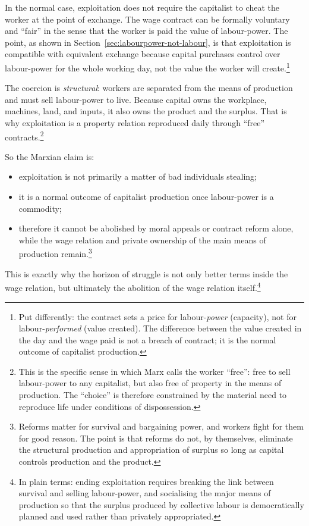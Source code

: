 In the normal case, exploitation does not require the capitalist to cheat the worker
at the point of exchange. The wage contract can be formally voluntary and ``fair'' in the sense that the worker is paid the value of labour-power. The point, as shown in Section~\ref{sec:labourpower-not-labour}, is that exploitation is compatible with equivalent exchange because capital purchases control over labour-power for the whole working day, not the value the worker will create.\footnote{Put differently: the contract sets a price for labour-\emph{power} (capacity), not for labour-\emph{performed} (value created). The difference between the value created in the day and the wage paid is not a breach of contract; it is the normal outcome of capitalist production.}

The coercion is \emph{structural}: workers are separated from the means of production
and must sell labour-power to live. Because capital owns the workplace, machines, land,
and inputs, it also owns the product and the surplus. That is why exploitation is a
property relation reproduced daily through ``free'' contracts.\footnote{This is the specific sense in which Marx calls the worker ``free'': free to sell labour-power to any capitalist, but also free of property in the means of production. The ``choice'' is therefore constrained by the material need to reproduce life under conditions of dispossession.}

So the Marxian claim is:

\begin{itemize}[leftmargin=1.5em]
  \item exploitation is not primarily a matter of bad individuals stealing;
  \item it is a normal outcome of capitalist production once labour-power is a commodity;
  \item therefore it cannot be abolished by moral appeals or contract reform alone,
        while the wage relation and private ownership of the main means of production remain.\footnote{Reforms matter for survival and bargaining power, and workers fight for them for good reason. The point is that reforms do not, by themselves, eliminate the structural production and appropriation of surplus so long as capital controls production and the product.}
\end{itemize}

This is exactly why the horizon of struggle is not only better terms inside the wage
relation, but ultimately the abolition of the wage relation itself.\footnote{In plain terms: ending exploitation requires breaking the link between survival and selling labour-power, and socialising the major means of production so that the surplus produced by collective labour is democratically planned and used rather than privately appropriated.}


